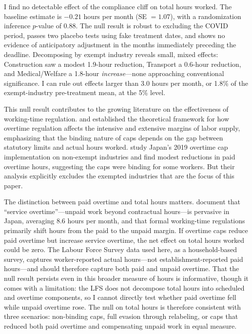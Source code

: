 \documentclass[12pt]{article}
\begin{document}
I find no detectable effect of the compliance cliff on total hours worked. The baseline estimate is $-0.21$ hours per month (SE $= 1.07$), with a randomization inference $p$-value of 0.88. The null result is robust to excluding the COVID period, passes two placebo tests using fake treatment dates, and shows no evidence of anticipatory adjustment in the months immediately preceding the deadline. Decomposing by exempt industry reveals small, mixed effects: Construction saw a modest 1.9-hour reduction, Transport a 0.6-hour reduction, and Medical/Welfare a 1.8-hour \textit{increase}---none approaching conventional significance. I can rule out effects larger than 3.0 hours per month, or 1.8\% of the exempt-industry pre-treatment mean, at the 5\% level.

This null result contributes to the growing literature on the effectiveness of working-time regulation. \citet{hamermesh1993} and \citet{trejo1991} established the theoretical framework for how overtime regulation affects the intensive and extensive margins of labor supply, emphasizing that the binding nature of caps depends on the gap between statutory limits and actual hours worked. \citet{burdin2024} study Japan's 2019 overtime cap implementation on non-exempt industries and find modest reductions in paid overtime hours, suggesting the caps were binding for some workers. But their analysis explicitly excludes the exempted industries that are the focus of this paper.

The distinction between paid overtime and total hours matters. \citet{kuroda2008} document that ``service overtime''---unpaid work beyond contractual hours---is pervasive in Japan, averaging 8.6 hours per month, and that formal working-time regulations primarily shift hours from the paid to the unpaid margin. If overtime caps reduce paid overtime but increase service overtime, the net effect on total hours worked could be zero. The Labour Force Survey data used here, as a household-based survey, captures worker-reported actual hours---not establishment-reported paid hours---and should therefore capture both paid and unpaid overtime. That the null result persists even in this broader measure of hours is informative, though it comes with a limitation: the LFS does not decompose total hours into scheduled and overtime components, so I cannot directly test whether paid overtime fell while unpaid overtime rose. The null on total hours is therefore consistent with three scenarios: non-binding caps, full evasion through relabeling, or caps that reduced both paid overtime and compensating unpaid work in equal measure.
\end{document}
